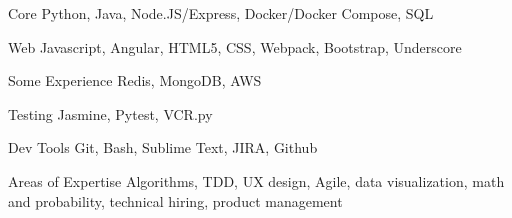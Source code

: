 

\begin{cvskills}

  \cvskill
    {Core}
    {Python, Java, Node.JS/Express, Docker/Docker Compose, SQL}

  \cvskill
    {Web}
    {Javascript, Angular, HTML5, CSS, Webpack, Bootstrap, Underscore}

  \cvskill
    {Some Experience}
    {Redis, MongoDB, AWS}

  \cvskill
    {Testing}
    {Jasmine, Pytest, VCR.py}

  \cvskill
    {Dev Tools}
    {Git, Bash, Sublime Text, JIRA, Github}

  \cvskill
    {Areas of Expertise}
    {Algorithms, TDD, UX design, Agile, data visualization, math and probability, technical hiring, product management}

\end{cvskills}
